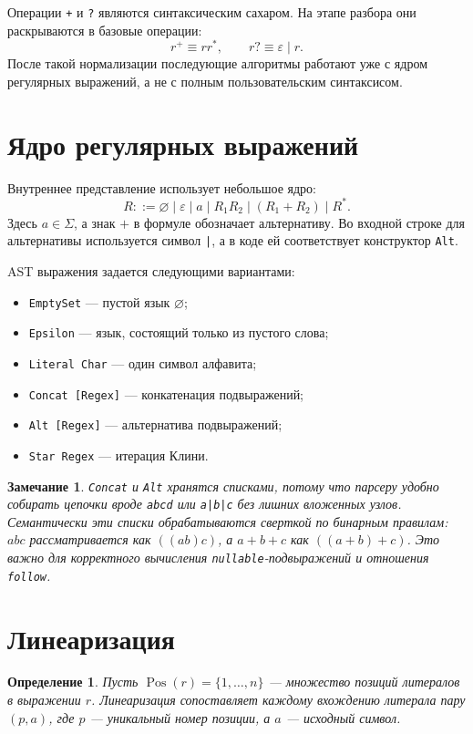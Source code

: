 \documentclass[12pt,a4paper]{article}
\newtheorem{definition}{Определение}
\newtheorem{remark}{Замечание}
\newcommand{\Pos}{\operatorname{Pos}}
\begin{document}
Операции \verb|+| и \verb|?| являются синтаксическим сахаром. На этапе разбора
они раскрываются в базовые операции:
\[
  r^+ \equiv rr^*, \qquad r? \equiv \varepsilon \mid r.
\]
После такой нормализации последующие алгоритмы работают уже с ядром регулярных
выражений, а не с полным пользовательским синтаксисом.

\section{Ядро регулярных выражений}

Внутреннее представление использует небольшое ядро:
\[
R ::= \varnothing \mid \varepsilon \mid a \mid R_1R_2
      \mid (R_1 + R_2) \mid R^*.
\]
Здесь $a \in \Sigma$, а знак $+$ в формуле обозначает альтернативу. Во входной
строке для альтернативы используется символ \texttt{|}, а в коде ей
соответствует конструктор \verb|Alt|.

AST выражения задается следующими вариантами:
\begin{itemize}
  \item \verb|EmptySet| --- пустой язык $\varnothing$;
  \item \verb|Epsilon| --- язык, состоящий только из пустого слова;
  \item \verb|Literal Char| --- один символ алфавита;
  \item \verb|Concat [Regex]| --- конкатенация подвыражений;
  \item \verb|Alt [Regex]| --- альтернатива подвыражений;
  \item \verb|Star Regex| --- итерация Клини.
\end{itemize}

\begin{remark}
\verb|Concat| и \verb|Alt| хранятся списками, потому что парсеру удобно
собирать цепочки вроде \verb|abcd| или \texttt{a|b|c} без лишних вложенных узлов.
Семантически эти списки обрабатываются сверткой по бинарным правилам:
$abc$ рассматривается как $((ab)c)$, а $a+b+c$ как $((a+b)+c)$.
Это важно для корректного вычисления \verb|nullable|-подвыражений и отношения
\verb|follow|.
\end{remark}

\section{Линеаризация}

\begin{definition}
Пусть $\Pos(r)=\{1,\ldots,n\}$ --- множество позиций литералов в выражении
$r$. Линеаризация сопоставляет каждому вхождению литерала пару $(p,a)$, где
$p$ --- уникальный номер позиции, а $a$ --- исходный символ.
\end{definition}
\end{document}
